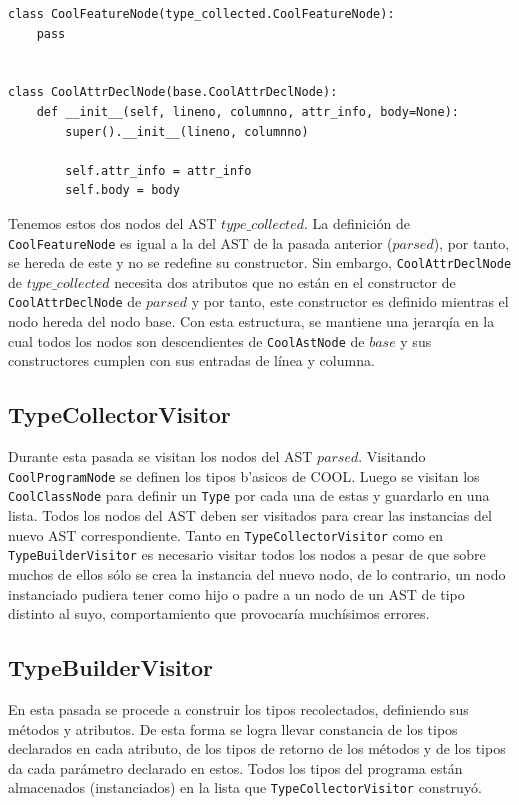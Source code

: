 \documentclass[a4paper,12pt]{article}
\def\code#1{\texttt{#1}}
\begin{document}
\begin{lstlisting}
class CoolFeatureNode(type_collected.CoolFeatureNode):
    pass


class CoolAttrDeclNode(base.CoolAttrDeclNode):
    def __init__(self, lineno, columnno, attr_info, body=None):
        super().__init__(lineno, columnno)

        self.attr_info = attr_info
        self.body = body
\end{lstlisting}

Tenemos estos dos nodos del AST $type\_collected$. La definición de \code{CoolFeatureNode} es igual a la del AST de la pasada anterior ($parsed$), por tanto, se hereda de este y no se redefine su constructor. Sin embargo, \code{CoolAttrDeclNode} de $type\_collected$ necesita dos atributos que no están en el constructor de \code{CoolAttrDeclNode} de $parsed$ y por tanto, este constructor es definido mientras el nodo hereda del nodo base. Con esta estructura, se mantiene una jerarqía en la cual todos los nodos son descendientes de \code{CoolAstNode} de $base$ y sus constructores cumplen con sus entradas de línea y columna.

\subsection*{TypeCollectorVisitor}
Durante esta pasada se visitan los nodos del AST $parsed$. Visitando \code{CoolProgramNode} se definen los tipos b'asicos de COOL. Luego se visitan los \code{CoolClassNode} para definir un \code{Type} por cada una de estas y guardarlo en una lista. Todos los nodos del AST deben ser visitados para crear las instancias del nuevo AST correspondiente. Tanto en \code{TypeCollectorVisitor} como en \code{TypeBuilderVisitor} es necesario visitar todos los nodos a pesar de que sobre muchos de ellos sólo se crea la instancia del nuevo nodo, de lo contrario, un nodo instanciado pudiera tener como hijo o padre a un nodo de un AST de tipo distinto al suyo, comportamiento que provocaría muchísimos errores.

\subsection*{TypeBuilderVisitor}
En esta pasada se procede a construir los tipos recolectados, definiendo sus métodos y atributos. De esta forma se logra llevar constancia de los tipos declarados en cada atributo, de los tipos de retorno de los métodos y de los tipos da cada parámetro declarado en estos. Todos los tipos del programa están almacenados (instanciados) en la lista que \code{TypeCollectorVisitor} construyó.
\end{document}
